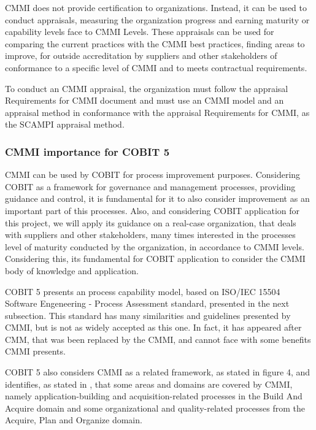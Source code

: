 CMMI does not provide certification to organizations. Instead, it can be used to conduct appraisals, measuring the organization progress and earning maturity or capability levels face to CMMI Levels. These appraisals can be used for comparing the current practices with the CMMI best practices, finding areas to improve, for outside accreditation by suppliers and other stakeholders of conformance to a specific level of CMMI and to meets contractual requirements.\par
To conduct an CMMI appraisal, the organization must follow the appraisal Requirements for CMMI document \cite{appraisalReqs} and must use an CMMI model and an appraisal method in conformance with the appraisal Requirements for CMMI, as the SCAMPI appraisal method\cite{Scampi}.\par


\subsubsection{CMMI importance for COBIT 5}

CMMI can be used by COBIT for process improvement purposes. Considering COBIT as a framework for governance and management processes, providing guidance and control, it is fundamental for it to also consider improvement as an important part of this processes. Also, and considering COBIT application for this project, we will apply its guidance on a real-case organization, that deals with suppliers and other stakeholders, many times interested in the processes level of maturity conducted by the organization, in accordance to CMMI levels. Considering this, its fundamental for COBIT application to consider the CMMI body of knowledge and application.\par
COBIT 5 presents an process capability model, based on ISO/IEC 15504 Software Engeneering - Process Assessment standard, presented in the next subsection. This standard has many similarities and guidelines presented by CMMI, but is not as widely accepted as this one. In fact, it has appeared after CMM, that was been replaced by the CMMI, and cannot face with some benefits CMMI presents.\par
COBIT 5 also considers CMMI as a related framework, as stated in figure 4, and identifies, as stated in \cite{2012cobit}, that some areas and domains are covered by CMMI, namely application-building and acquisition-related processes in the Build And Acquire domain and some organizational and quality-related processes from the Acquire, Plan and Organize domain.\par


